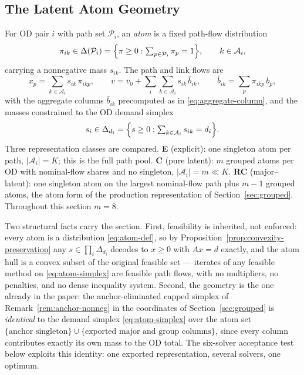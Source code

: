 \subsection{The Latent Atom Geometry}
\label{sec:atom-geometry}

For OD pair $i$ with path set $\mathcal P_i$, an \emph{atom} is a fixed
path-flow distribution
\begin{equation}
\label{eq:atom-def}
\pi_{ik} \in \Delta(\mathcal P_i)
= \Bigl\{\pi \ge 0 : \textstyle\sum_{p \in \mathcal P_i} \pi_p = 1\Bigr\},
\qquad k \in \mathcal A_i,
\end{equation}
carrying a nonnegative mass $s_{ik}$. The path and link flows are
\begin{equation}
\label{eq:atom-decode}
x_p = \sum_{k \in \mathcal A_i} s_{ik}\, \pi_{ikp},
\qquad
v = \bar v_0 + \sum_i \sum_{k \in \mathcal A_i} s_{ik}\, \bar b_{ik},
\qquad
\bar b_{ik} = \sum_{p} \pi_{ikp}\, b_p,
\end{equation}
with the aggregate columns $\bar b_{ik}$ precomputed as in
\eqref{eq:aggregate-column}, and the masses constrained to the OD demand
simplex
\begin{equation}
\label{eq:atom-simplex}
s_i \in \Delta_{d_i}
= \Bigl\{ s \ge 0 : \textstyle\sum_{k \in \mathcal A_i} s_{ik} = d_i
\Bigr\}.
\end{equation}
Three representation classes are compared. \textbf{E} (explicit): one
singleton atom per path, $|\mathcal A_i| = K$; this is the full path
pool. \textbf{C} (pure latent): $m$ grouped atoms per OD with
nominal-flow shares and no singleton, $|\mathcal A_i| = m \ll K$.
\textbf{RC} (major--latent): one singleton atom on the largest
nominal-flow path plus $m-1$ grouped atoms, the atom form of the
production representation of Section~\ref{sec:grouped}. Throughout this
section $m = 8$.

Two structural facts carry the section. First, feasibility is
inherited, not enforced: every atom is a distribution
\eqref{eq:atom-def}, so by
Proposition~\ref{prop:convexity-preservation} any
$s \in \prod_i \Delta_{d_i}$ decodes to $x \ge 0$ with $Ax = d$ exactly,
and the atom hull is a convex subset of the original feasible set ---
iterates of any feasible method on \eqref{eq:atom-simplex} are feasible
path flows, with no multipliers, no penalties, and no dense inequality
system. Second, the geometry is the one already in the paper: the
anchor-eliminated capped simplex of Remark~\ref{rem:anchor-nonneg} in
the coordinates of Section~\ref{sec:grouped} is \emph{identical} to the
demand simplex \eqref{eq:atom-simplex} over the atom set
$\{\text{anchor singleton}\} \cup \{\text{exported major and group
columns}\}$, since every column contributes exactly its own mass to the
OD total. The six-solver acceptance test below exploits this identity:
one exported representation, several solvers, one optimum.

